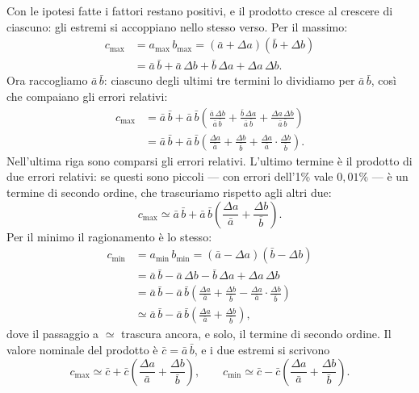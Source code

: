 \documentclass[11pt,a4paper]{article}
\begin{document}
Con le ipotesi fatte i fattori restano positivi, e il prodotto cresce al
crescere di ciascuno: gli estremi si accoppiano nello stesso verso. Per il
massimo:
\begin{align*}
c_{\max} &= a_{\max}\,b_{\max} = (\bar a + \Delta a)(\bar b + \Delta b)\\
&= \bar a\,\bar b + \bar a\,\Delta b + \bar b\,\Delta a + \Delta a\,\Delta b.
\end{align*}
Ora raccogliamo $\bar a\,\bar b$: ciascuno degli ultimi tre termini lo
dividiamo per $\bar a\,\bar b$, così che compaiano gli errori relativi:
\begin{align*}
c_{\max} &= \bar a\,\bar b + \bar a\,\bar b\left(\frac{\bar a\,\Delta b}{\bar a\,\bar b} + \frac{\bar b\,\Delta a}{\bar a\,\bar b} + \frac{\Delta a\,\Delta b}{\bar a\,\bar b}\right)\\
&= \bar a\,\bar b + \bar a\,\bar b\left(\frac{\Delta a}{\bar a} + \frac{\Delta b}{\bar b} + \frac{\Delta a}{\bar a}\cdot\frac{\Delta b}{\bar b}\right).
\end{align*}
Nell'ultima riga sono comparsi gli errori relativi. L'ultimo termine è il
prodotto di due errori relativi: se questi sono piccoli --- con errori
dell'1\% vale $0{,}01\%$ --- è un termine di secondo ordine, che
trascuriamo rispetto agli altri due:
\begin{equation*}
c_{\max} \simeq \bar a\,\bar b + \bar a\,\bar b\left(\frac{\Delta a}{\bar a} + \frac{\Delta b}{\bar b}\right).
\end{equation*}
Per il minimo il ragionamento è lo stesso:
\begin{align*}
c_{\min} &= a_{\min}\,b_{\min} = (\bar a - \Delta a)(\bar b - \Delta b)\\
&= \bar a\,\bar b - \bar a\,\Delta b - \bar b\,\Delta a + \Delta a\,\Delta b\\
&= \bar a\,\bar b - \bar a\,\bar b\left(\frac{\Delta a}{\bar a} + \frac{\Delta b}{\bar b} - \frac{\Delta a}{\bar a}\cdot\frac{\Delta b}{\bar b}\right)\\
&\simeq \bar a\,\bar b - \bar a\,\bar b\left(\frac{\Delta a}{\bar a} + \frac{\Delta b}{\bar b}\right),
\end{align*}
dove il passaggio a $\simeq$ trascura ancora, e solo, il termine di secondo
ordine. Il valore nominale del prodotto è $\bar c = \bar a\,\bar b$, e i due
estremi si scrivono
\begin{equation*}
c_{\max} \simeq \bar c + \bar c\left(\frac{\Delta a}{\bar a} + \frac{\Delta b}{\bar b}\right),
\qquad
c_{\min} \simeq \bar c - \bar c\left(\frac{\Delta a}{\bar a} + \frac{\Delta b}{\bar b}\right).
\end{equation*}
\end{document}
